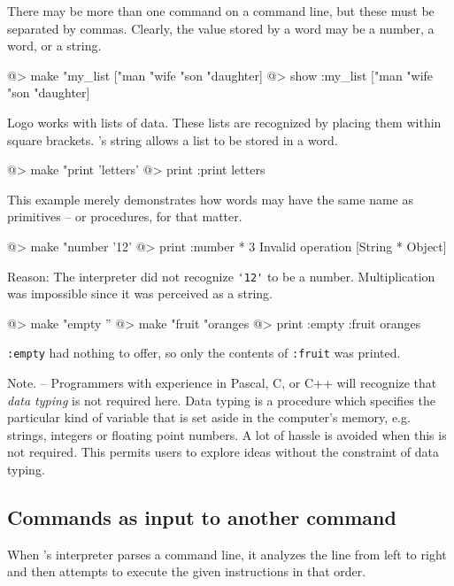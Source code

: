 There may be more than one command on a command line, but these must be separated by commas.  Clearly, the value stored by a word may be a number, a word, or a string.

\begin{verbatimtab}
@> make "my_list ["man "wife "son "daughter] 
@> show :my_list
["man "wife "son "daughter]
\end{verbatimtab}

Logo works with lists of data.  These lists are recognized by placing them within square brackets.  \squirrel's string allows a list to be stored in a word.

\begin{verbatimtab}
@> make "print 'letters' 
@> print :print 
letters
\end{verbatimtab}
 
This example merely demonstrates how words may have the same name as primitives -- or procedures, for that matter.
 
\begin{verbatimtab}
@> make "number '12' 
@> print :number * 3 
Invalid operation [String * Object]
\end{verbatimtab}  
 
Reason:  The interpreter did not recognize \verb+'12'+ to be a number.  Multiplication was impossible since it was perceived as a string.

\begin{verbatimtab}
@> make "empty ''
@> make "fruit "oranges 
@> print :empty :fruit
oranges
\end{verbatimtab}

{\tt :empty} had nothing to offer, so only the contents of {\tt :fruit} was printed.
  
Note. -- Programmers with experience in Pascal, C, or C++ will recognize that {\em data typing} is not required here.  Data typing is a procedure which specifies the particular kind of variable that is set aside in the computer's memory, e.g. strings, integers or floating point numbers.  A lot of hassle is avoided when this is not required.  This permits users to explore ideas without the constraint of data typing.
 
\subsection{Commands as input to another command} 
 
When \squirrel's interpreter parses a command line, it analyzes the line from left to right and then attempts to execute the given instructions in that order.\\
 
